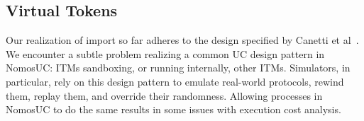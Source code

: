 %
%
%
%
%

\subsection{Virtual Tokens}
Our realization of import so far adheres to the design specified by Canetti et al~\cite{canettiUC}.
We encounter a subtle problem realizing a common UC design pattern in NomosUC: ITMs sandboxing, or running internally, other ITMs.
Simulators, in particular, rely on this design pattern to emulate real-world protocols, rewind them, replay them, and override their randomness.
Allowing processes in NomosUC to do the same results in some issues with execution cost analysis.

